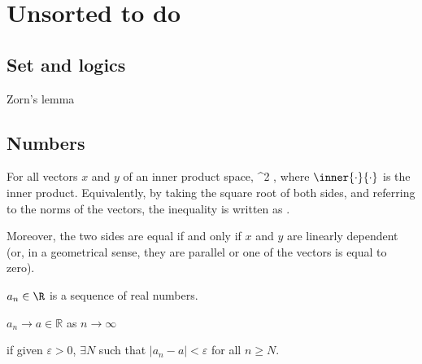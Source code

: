 

\chapter{Unsorted to do}

\section{Set and logics}

Zorn's lemma

\section{Numbers}

\begin{theorem}\label{thm:cauchy_schwarz_inequality_inner_product}
For all vectors $x$ and $y$ of an inner product space,
\be
{}^2 \leq {} \cdot {},
\ee
where $\inner{\cdot}{\cdot}$ is the inner product. Equivalently, by taking the square root of both sides, and referring to the norms of the vectors, the inequality is written as 
\be
{} \leq {} \cdot {}.
\ee 

Moreover, the two sides are equal if and only if $x$ and $y$ are linearly dependent (or, in a geometrical sense, they are parallel or one of the vectors is equal to zero).
\end{theorem}

\qcutline


$a_n\in\R$ is a sequence of real numbers.

\begin{definition}
$a_n\to a\in \mathbb{R}$ as $n\to \infty$

if given $\varepsilon>0$, $\exists N$ such that $|a_n-a|<\varepsilon$ for all $n\geq N$.
\end{definition}



